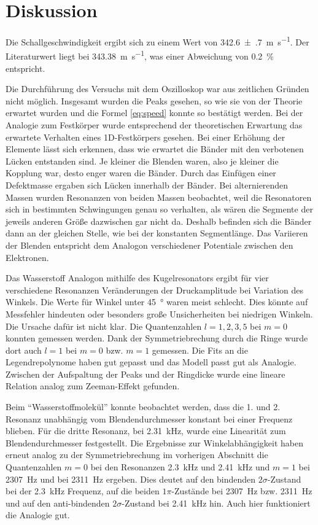 \section{Diskussion}
\label{sec:Diskussion}

Die Schallgeschwindigkeit ergibt sich zu einem Wert von \SI{342.6(7)}{\meter\per\second}. Der Literaturwert liegt bei \SI{343.38}{\meter\per\second}, was einer Abweichung von \SI{0.2}{\percent} entspricht. 

Die Durchführung des Versuchs mit dem Oszilloskop war aus zeitlichen Gründen nicht möglich. 
Insgesamt wurden die Peaks gesehen, so wie sie von der Theorie erwartet wurden und die Formel \eqref{eq:speed} konnte so bestätigt werden. 
Bei der Analogie zum Festkörper wurde entsprechend der theoretischen Erwartung das erwartete Verhalten eines 1D-Festkörpers gesehen. Bei einer Erhöhung der Elemente lässt sich erkennen, dass wie erwartet die Bänder mit den verbotenen Lücken entstanden sind. Je kleiner die Blenden waren, also je kleiner die Kopplung war, desto enger waren die Bänder. 
Durch das Einfügen einer Defektmasse ergaben sich Lücken innerhalb der Bänder. 
Bei alternierenden Massen wurden Resonanzen von beiden Massen beobachtet, weil die Resonatoren sich in bestimmten Schwingungen genau so verhalten, als wären die Segmente der jeweils anderen Größe dazwischen gar nicht da. Deshalb befinden sich die Bänder dann an der gleichen Stelle, wie bei der konstanten Segmentlänge.
Das Variieren der Blenden entspricht dem Analogon verschiedener Potentiale zwischen den Elektronen. 

Das Wasserstoff Analogon mithilfe des Kugelresonators ergibt für vier verschiedene Resonanzen Veränderungen der Druckamplitude bei Variation des Winkels. Die Werte für Winkel unter \SI{45}{\degree} waren meist schlecht. Dies könnte auf Messfehler hindeuten oder besonders große Unsicherheiten bei niedrigen Winkeln. Die Ursache dafür ist nicht klar. 
Die Quantenzahlen $l=1,2,3,5$ bei $m=0$ konnten gemessen werden. Dank der Symmetriebrechung durch die Ringe wurde dort auch $l = 1$ bei $m=0$ bzw. $m=1$ gemessen. Die Fits an die Legendrepolynome haben gut gepasst und das Modell passt gut als Analogie. 
Zwischen der Aufspaltung der Peaks und der Ringdicke wurde eine lineare Relation analog zum Zeeman-Effekt gefunden. 

Beim \enquote{Wasserstoffmolekül} konnte beobachtet werden, dass die 1. und 2. Resonanz  unabhängig vom Blendendurchmesser konstant bei einer Frequenz blieben. 
Für die dritte Resonanz, bei \SI{2.31}{\kilo\hertz}, wurde eine Linearität zum Blendendurchmesser festgestellt.
Die Ergebnisse zur Winkelabhängigkeit haben erneut analog zu der Symmetriebrechung im vorherigen Abschnitt die Quantenzahlen $m = 0$ bei den Resonanzen \SI{2.3}{\kilo\hertz} und \SI{2.41}{\kilo\hertz} und $m = 1$ bei \SI{2307}{\hertz} und bei \SI{2311}{\hertz} ergeben. Dies deutet auf den bindenden $2 \sigma$-Zustand bei der \SI{2.3}{\kilo\hertz} Frequenz, auf die beiden $1 \pi$-Zustände bei \SI{2307}{\hertz} bzw. \SI{2311}{\hertz} und auf den anti-bindenden $2 \sigma$-Zustand bei \SI{2.41}{\kilo\hertz} hin. 
Auch hier funktioniert die Analogie gut.